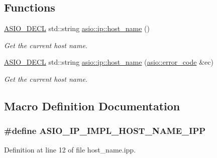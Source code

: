 \subsection*{Functions}
\begin{DoxyCompactItemize}
\item 
\hyperlink{config_8hpp_ab54d01ea04afeb9a8b39cfac467656b7}{A\+S\+I\+O\+\_\+\+D\+E\+C\+L} std\+::string \hyperlink{namespaceasio_1_1ip_a9fb69e400d86dec2d2523bd63a103e76}{asio\+::ip\+::host\+\_\+name} ()
\begin{DoxyCompactList}\small\item\em Get the current host name. \end{DoxyCompactList}\item 
\hyperlink{config_8hpp_ab54d01ea04afeb9a8b39cfac467656b7}{A\+S\+I\+O\+\_\+\+D\+E\+C\+L} std\+::string \hyperlink{namespaceasio_1_1ip_a445bc3ef2239d953e73308d62244a8ad}{asio\+::ip\+::host\+\_\+name} (\hyperlink{classasio_1_1error__code}{asio\+::error\+\_\+code} \&ec)
\begin{DoxyCompactList}\small\item\em Get the current host name. \end{DoxyCompactList}\end{DoxyCompactItemize}


\subsection{Macro Definition Documentation}
\hypertarget{host__name_8ipp_aa0b30e8af8b179a48a97e8ae9b1f02a3}{}
\subsubsection[{A\+S\+I\+O\+\_\+\+I\+P\+\_\+\+I\+M\+P\+L\+\_\+\+H\+O\+S\+T\+\_\+\+N\+A\+M\+E\+\_\+\+I\+P\+P}]{\setlength{\rightskip}{0pt plus 5cm}\#define A\+S\+I\+O\+\_\+\+I\+P\+\_\+\+I\+M\+P\+L\+\_\+\+H\+O\+S\+T\+\_\+\+N\+A\+M\+E\+\_\+\+I\+P\+P}\label{host__name_8ipp_aa0b30e8af8b179a48a97e8ae9b1f02a3}


Definition at line 12 of file host\+\_\+name.\+ipp.

